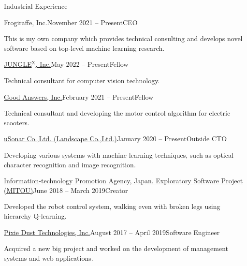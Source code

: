 \documentclass{resume} %
\begin{document}
\begin{rSection}{Industrial Experience}

    \begin{rSubsection}{Frogiraffe, Inc.}{November 2021 -- Present}{CEO}{}
    \item This is my own company which provides technical consulting and develops novel software based on top-level machine learning research.
    \end{rSubsection}

    \begin{rSubsection}{\href{https://jungle.xyz/}{JUNGLE${}^\text{X}$, Inc.}}{May 2022 -- Present}{Fellow}{}
    \item Technical consultant for computer vision technology.
    \end{rSubsection}

    \begin{rSubsection}{\href{https://info.gbiz.go.jp/hojin/ichiran?hojinBango=2430001082637}{Good Answers, Inc.}}{February 2021 -- Present}{Fellow}{}
    \item Technical consultant and developing the motor control algorithm for electric scooters.
    \end{rSubsection}

    \begin{rSubsection}{\href{https://www.landscape.co.jp/}{uSonar Co.,Ltd. (Landscape Co.,Ltd.)}}{January 2020 -- Present}{Outside CTO}{}
    \item Developing various systems with machine learning techniques, such as optical character recognition and image recognition.
    \end{rSubsection}

    \begin{rSubsection}{\href{https://www.mitou.org/}{Information-technology Promotion Agency, Japan. Exploratory Software Project (MITOU)}}{June 2018 -- March 2019}{Creator}{}
    \item Developed the robot control system, walking even with broken legs using hierarchy Q-learning.
    \end{rSubsection}

    \begin{rSubsection}{\href{http://pixiedusttech.com/}{Pixie Dust Technologies, Inc.}}{August 2017 -- April 2019}{Software Engineer}{}
    \item Acquired a new big project and worked on the development of management systems and web applications.
    \end{rSubsection}


\end{rSection}
\end{document}

